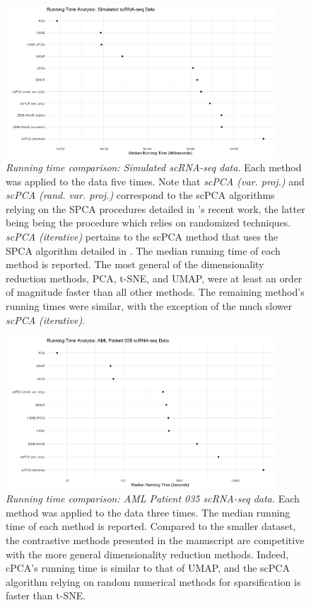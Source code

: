 \documentclass{article}
\begin{document}
\begin{figure}
    \centering
    \includegraphics[width = 0.9\textwidth]{figures/rt_analsysis_sim_data.png}
    \caption{
    {\em Running time comparison: Simulated scRNA-seq data.} Each method was applied to the data five times. Note that \textit{scPCA (var. proj.)} and \textit{scPCA (rand. var. proj.)} correspond to the scPCA algorithms relying on the SPCA procedures detailed in \citet{erichson2018sparse}'s recent work, the latter being being the procedure which relies on randomized techniques. \textit{scPCA (iterative)} pertains to the scPCA method that uses the SPCA algorithm detailed in \citet{Zou2006}. The median running time of each method is reported. The most general of the dimensionality reduction methods, PCA, t-SNE, and UMAP, were at least an order of magnitude faster than all other methods. The remaining method's running times were similar, with the exception of the much slower \textit{scPCA (iterative)}.
    }
    \label{fig:rt_sim_sc_rna-seq}
\end{figure}

\begin{figure}
    \centering
    \includegraphics[width = 0.9\textwidth]{figures/rt_analsysis_aml035.png}
    \caption{
    {\em Running time comparison: AML Patient 035 scRNA-seq data.} Each method was applied to the data three times. The median running time of each method is reported. Compared to the smaller dataset, the contrastive methods presented in the manuscript are competitive with the more general dimensionality reduction methods. Indeed, cPCA's running time is similar to that of UMAP, and the scPCA algorithm relying on random numerical methods for sparsification is faster than t-SNE.
    }
    \label{fig:rt_aml035}
\end{figure}

\newpage



 
\end{document}
